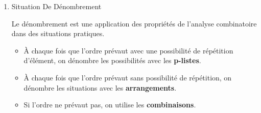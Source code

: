 \documentclass[12pt,a4paper]{article}
\newcounter{exemple}
\newcommand{\exemple}{
\refstepcounter{exemple}
\textbf{\textcolor{orange}{Exemple \theexemple : }}
}
\begin{document}
\begin{enumerate}[label=\Roman*., font=\bfseries\color{red}]
\begin{enumerate}
\textbf{Binome De NEWTON}																																																																																																					
Soient $a$ et $b$ deux réels, $n \in \mathbb{N}, n \ge 1$

\begin{center}
    {\color{red}
    \fboxsep=10pt
    }
\end{center}

$(a+b)^n = {\color{red}C_n^0} a^n + {\color{red}C_n^1} a^{n-1}b + {\color{red}C_n^2} a^{n-2}b^2 + \dots + {\color{red}C_n^{n-1}} ab^{n-1} + {\color{red}C_n^n} b^n$

\exemple

$(a+b)^2 = a^2 + 2ab + b^2$ \\
$(a+b)^3 = a^3 + 3a^2b + 3ab^2 + b^3$ \\
$(a+b)^4 = a^4 + 4a^3b + 6a^2b^2 + 4ab^3 + b^4$ \\
$(a+b)^5 = a^5 + 5a^4b + 10a^3b^2 + 10a^2b^3 + 5ab^4 + b^5$

\vspace{0.5cm}

Soit $f(x) = (2x+3)^5$ \\
Donner la forme développée de $f(x)$ \\
$f(x) = C_5^0 (2x)^5 + C_5^1 (2x)^4(3) + C_5^2 (2x)^3(3)^2 + C_5^3 (2x)^2(3)^3 + C_5^4 (2x)(3)^4 + C_5^5 (3)^5$

\begin{center}
\end{center}
\item Situation De Dénombrement

Le dénombrement est une application des propriétés de l'analyse combinatoire dans des situations pratiques.

\begin{itemize}
    \item À chaque fois que l'ordre prévaut avec une possibilité de répétition d'élément, on dénombre les possibilités avec les \textbf{p-listes}.
    \item À chaque fois que l'ordre prévaut sans possibilité de répétition, on dénombre les situations avec les \textbf{arrangements}.
    \item Si l'ordre ne prévaut pas, on utilise les \textbf{combinaisons}.
\end{itemize}


\end{enumerate}
\end{enumerate}
\end{document}
